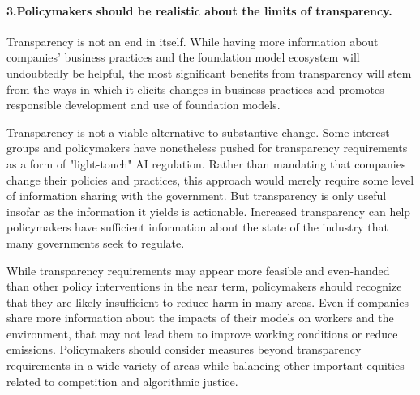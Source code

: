  \paragraph{3.\phantom{X}Policymakers should be realistic about the limits of transparency.}
\begin{myitemize}
\item Transparency is not an end in itself. 
While having more information about companies' business practices and the foundation model ecosystem will undoubtedly be helpful, the most significant benefits from transparency will stem from the ways in which it elicits changes in business practices and promotes responsible development and use of foundation models.
\item Transparency is not a viable alternative to substantive change.
Some interest groups and policymakers have nonetheless pushed for transparency requirements as a form of "light-touch" AI regulation.
Rather than mandating that companies change their policies and practices, this approach would merely require some level of information sharing with the government.
But transparency is only useful insofar as the information it yields is actionable.
Increased transparency can help policymakers have sufficient information about the state of the industry that many governments seek to regulate.
\item While transparency requirements may appear more feasible and even-handed than other policy interventions in the near term, policymakers should recognize that they are likely insufficient to reduce harm in many areas. 
Even if companies share more information about the impacts of their models on workers and the environment, that may not lead them to improve working conditions or reduce emissions. 
Policymakers should consider measures beyond transparency requirements in a wide variety of areas while balancing other important equities related to competition and algorithmic justice. 
\end{myitemize}
